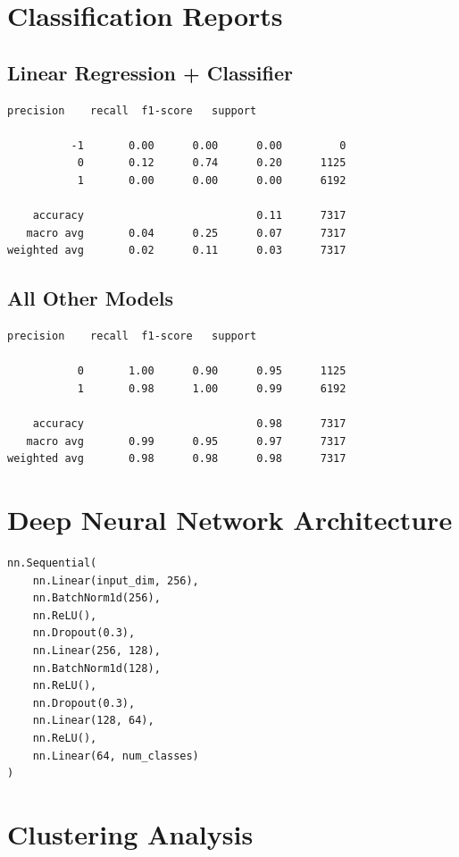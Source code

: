 \documentclass{article}
\begin{document}
\section{Classification Reports}

\subsection*{Linear Regression + Classifier}
\begin{Verbatim}[fontsize=\small]
              precision    recall  f1-score   support

          -1       0.00      0.00      0.00         0
           0       0.12      0.74      0.20      1125
           1       0.00      0.00      0.00      6192

    accuracy                           0.11      7317
   macro avg       0.04      0.25      0.07      7317
weighted avg       0.02      0.11      0.03      7317
\end{Verbatim}


\subsection*{All Other Models}
\begin{Verbatim}[fontsize=\small]
              precision    recall  f1-score   support

           0       1.00      0.90      0.95      1125
           1       0.98      1.00      0.99      6192

    accuracy                           0.98      7317
   macro avg       0.99      0.95      0.97      7317
weighted avg       0.98      0.98      0.98      7317
\end{Verbatim}

\section{Deep Neural Network Architecture}
\begin{verbatim}
nn.Sequential(
    nn.Linear(input_dim, 256),
    nn.BatchNorm1d(256),
    nn.ReLU(),
    nn.Dropout(0.3),
    nn.Linear(256, 128),
    nn.BatchNorm1d(128),
    nn.ReLU(),
    nn.Dropout(0.3),
    nn.Linear(128, 64),
    nn.ReLU(),
    nn.Linear(64, num_classes)
)
\end{verbatim}

\section{Clustering Analysis}
\end{document}
